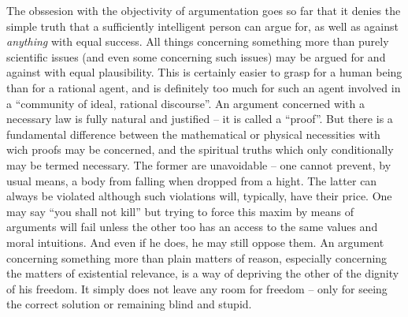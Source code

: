 The obssesion
with the objectivity of argumentation goes so far that it denies the simple
truth that a sufficiently intelligent person can argue for, as well as against
{\em anything} with equal success. All things concerning something more than
purely scientific issues (and even some concerning such issues) may be argued
for and against with equal plausibility. This is certainly easier to grasp for
a human being than for a rational agent, and is definitely too much for such
an agent involved in a ``community of ideal, rational discourse''.
An argument concerned with a necessary law is fully natural and justified --
it is called a ``proof''. But there is a fundamental difference between the
mathematical or physical necessities with wich proofs may be concerned, and
the spiritual truths which only conditionally may be termed necessary. The former
are unavoidable -- one cannot prevent, by usual means, a body from falling when 
dropped from a hight. The latter can always be violated although such violations
will, typically, have their price. One may say ``you shall not kill'' but 
trying to force this maxim by means of arguments will fail unless the other too
has an access to the same values and moral intuitions. And even if he does, he
may still oppose them.
An argument concerning something more than plain matters of reason, especially
concerning the matters of existential relevance, is a way of depriving the
other of the dignity of his freedom. It simply does not leave any room for 
freedom -- only for seeing the correct solution or remaining blind and stupid.

